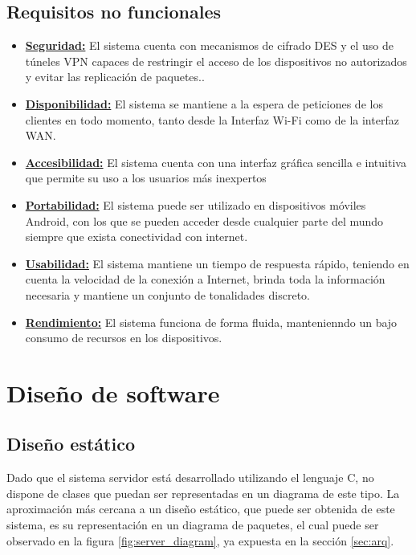 \documentclass[12pt, twoside]{article}
\begin{document}
    \subsection{Requisitos no funcionales}
        \begin{itemize}
            \item \textbf{\underline{Seguridad:}}
            El sistema cuenta con mecanismos de cifrado DES y el uso de túneles VPN capaces de restringir el acceso de los dispositivos no autorizados y evitar las replicación de paquetes..
            \item \textbf{\underline{Disponibilidad:}}
            El sistema se mantiene a la espera de peticiones de los clientes en todo momento, tanto desde la Interfaz Wi-Fi como de la interfaz WAN.
            \item \textbf{\underline{Accesibilidad:}}
            El sistema cuenta con una interfaz gráfica sencilla e intuitiva que permite su uso a los usuarios más inexpertos
            \item \textbf{\underline{Portabilidad:}}
            El sistema puede ser utilizado en dispositivos móviles Android, con los que se pueden acceder desde cualquier parte del mundo siempre que exista conectividad con internet.
            \item \textbf{\underline{Usabilidad:}}
            El sistema mantiene un tiempo de respuesta rápido, teniendo en cuenta la velocidad de la conexión a Internet, brinda toda la información necesaria y mantiene un conjunto de tonalidades discreto.
            \item \textbf{\underline{Rendimiento:}}
            El sistema funciona de forma fluida, mantenienndo un bajo consumo de recursos en los dispositivos.
        \end{itemize}

\cleardoublepage \section{Diseño de software} \label{sec:dis}
    \subsection{Diseño estático}
        Dado que el sistema servidor está desarrollado utilizando el lenguaje C, no dispone de clases que puedan ser representadas en un diagrama de este tipo. La aproximación más cercana a un diseño estático, que puede ser obtenida de este sistema, es su representación en un diagrama de paquetes, el cual puede ser observado en la figura \ref{fig:server_diagram}, ya expuesta en la sección \ref{sec:arq}.
\end{document}
